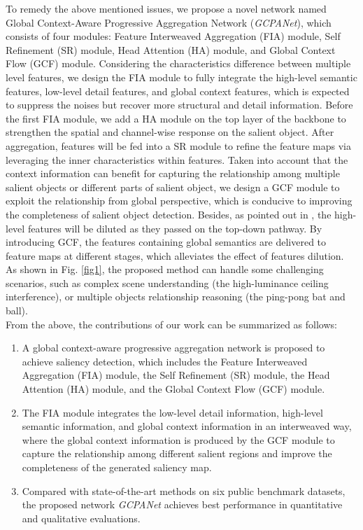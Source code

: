 \documentclass[letterpaper]{article} \usepackage{aaai20}  \usepackage{times}  \usepackage{helvet} \usepackage{courier}  \usepackage[hyphens]{url}  \usepackage{graphicx} \urlstyle{rm} \def\UrlFont{\rm}  \usepackage{graphicx}  \frenchspacing  \setlength{\pdfpagewidth}{8.5in}  \setlength{\pdfpageheight}{11in}
\begin{document}
\indent To remedy the above mentioned issues, we propose a novel network named Global Context-Aware Progressive Aggregation Network (\textit{GCPANet}), which consists of four modules: Feature Interweaved Aggregation (FIA) module, Self Refinement (SR) module, Head Attention (HA) module, and Global Context Flow (GCF) module. Considering the characteristics difference between multiple level features, we design the FIA module to fully integrate the high-level semantic features, low-level detail features, and global context features, which is expected to suppress the noises but recover more structural and detail information. Before the first FIA module, we add a HA module on the top layer of the backbone to strengthen the spatial and channel-wise response on the salient object. After aggregation, features will be fed into a SR module to refine the feature maps via leveraging the inner characteristics within features. Taken into account that the context information can benefit for capturing the relationship among multiple salient objects or different parts of salient object, we design a GCF module to exploit the relationship from global perspective, which is conducive to improving the completeness of salient object detection. Besides, as pointed out in \cite{liu2019simple}, the high-level features will be diluted as they passed on the top-down pathway. By introducing GCF, the features containing global semantics are delivered to feature maps at different stages, which alleviates the effect of features dilution. As shown in Fig. \ref{fig1}, the proposed method can handle some challenging scenarios, such as complex scene understanding (the high-luminance ceiling interference), or multiple objects relationship reasoning (the ping-pong bat and ball). \\
\indent From the above, the contributions of our work can be summarized as follows:
\begin{enumerate} 
\item A global context-aware progressive aggregation network is proposed to achieve saliency detection, which includes the Feature Interweaved Aggregation (FIA) module,
the Self Refinement (SR) module, the Head Attention (HA) module, and the Global Context Flow (GCF) module.
\item The FIA module integrates the low-level detail information, high-level semantic information, and global context information in an interweaved way, where 
the global context information is produced by the GCF module to capture the relationship among different salient regions and improve the completeness of the generated saliency map.
\item Compared with  state-of-the-art methods on six public benchmark datasets, the proposed network \textit{GCPANet} achieves best performance in quantitative and qualitative evaluations.  
\end{enumerate} 
\end{document}
